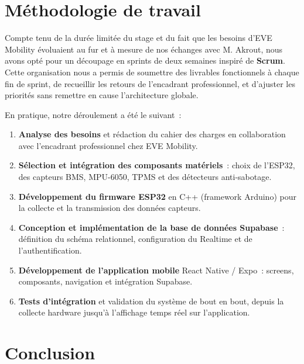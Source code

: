 \documentclass[12pt, a4paper]{report}
\begin{document}
\section{Méthodologie de travail}

Compte tenu de la durée limitée du stage et du fait que les besoins d'EVE Mobility
évoluaient au fur et à mesure de nos échanges avec M. Akrout, nous avons opté pour
un découpage en sprints de deux semaines inspiré de \textbf{Scrum}. Cette organisation
nous a permis de soumettre des livrables fonctionnels à chaque fin de sprint, de
recueillir les retours de l'encadrant professionnel, et d'ajuster les priorités sans
remettre en cause l'architecture globale.

En pratique, notre déroulement a été le suivant~:

\begin{enumerate}
  \item \textbf{Analyse des besoins} et rédaction du cahier des charges en
        collaboration avec l'encadrant professionnel chez EVE Mobility.
  \item \textbf{Sélection et intégration des composants matériels}~: choix de
        l'ESP32, des capteurs BMS, MPU-6050, TPMS et des détecteurs anti-sabotage.
  \item \textbf{Développement du firmware ESP32} en C++ (framework Arduino) pour
        la collecte et la transmission des données capteurs.
  \item \textbf{Conception et implémentation de la base de données Supabase}~:
        définition du schéma relationnel, configuration du Realtime et de
        l'authentification.
  \item \textbf{Développement de l'application mobile} React Native / Expo~:
        screens, composants, navigation et intégration Supabase.
  \item \textbf{Tests d'intégration} et validation du système de bout en bout,
        depuis la collecte hardware jusqu'à l'affichage temps réel sur
        l'application.
\end{enumerate}

\section*{Conclusion}
\end{document}
